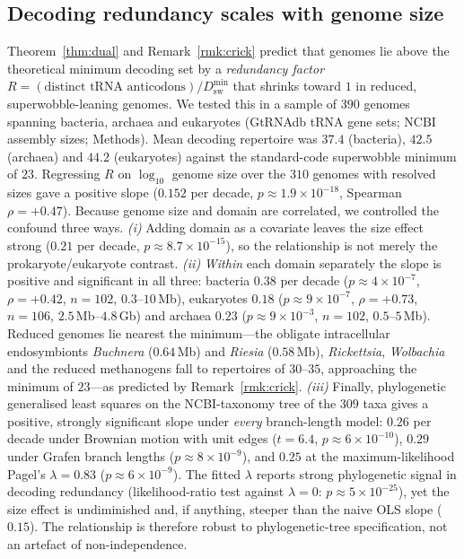 \documentclass[11pt]{article}
\theoremstyle{remark}
\newcommand{\Dsw}{D_{\mathrm{sw}}}
\begin{document}
\subsection{Decoding redundancy scales with genome size}

Theorem~\ref{thm:dual} and Remark~\ref{rmk:crick} predict that genomes lie above
the theoretical minimum decoding set by a \emph{redundancy factor}
$R=(\text{distinct tRNA anticodons})/\Dsw^{\min}$ that shrinks toward $1$ in
reduced, superwobble-leaning genomes. We tested this in a sample of $390$ genomes
spanning bacteria, archaea and eukaryotes (GtRNAdb tRNA gene sets; NCBI assembly
sizes; Methods). Mean decoding repertoire was $37.4$ (bacteria), $42.5$
(archaea) and $44.2$ (eukaryotes) against the standard-code superwobble minimum
of $23$. Regressing $R$ on $\log_{10}$ genome size over the $310$ genomes with
resolved sizes gave a positive slope ($0.152$ per decade,
$p\approx1.9\times10^{-18}$, Spearman $\rho=+0.47$). Because genome size and domain
are correlated, we controlled the confound three ways. \emph{(i)} Adding domain
as a covariate leaves the size effect strong ($0.21$ per decade,
$p\approx8.7\times10^{-15}$), so the relationship is not merely the
prokaryote/eukaryote contrast. \emph{(ii)} \emph{Within} each domain separately
the slope is positive and significant in all three: bacteria $0.38$ per decade
($p\approx4\times10^{-7}$, $\rho=+0.42$, $n=102$, $0.3$--$10$\,Mb), eukaryotes
$0.18$ ($p\approx9\times10^{-7}$, $\rho=+0.73$, $n=106$, $2.5$\,Mb--$4.8$\,Gb)
and archaea $0.23$ ($p\approx9\times10^{-3}$, $n=102$, $0.5$--$5$\,Mb). Reduced
genomes lie nearest the minimum---the obligate intracellular endosymbionts
\emph{Buchnera} ($0.64$\,Mb) and \emph{Riesia} ($0.58$\,Mb), \emph{Rickettsia},
\emph{Wolbachia} and the reduced methanogens fall to repertoires of $30$--$35$,
approaching the minimum of $23$---as predicted by Remark~\ref{rmk:crick}.
\emph{(iii)} Finally, phylogenetic generalised least squares on the
NCBI-taxonomy tree of the $309$ taxa gives a positive, strongly significant slope
under \emph{every} branch-length model: $0.26$ per decade under Brownian motion
with unit edges ($t=6.4$, $p\approx6\times10^{-10}$), $0.29$ under Grafen branch
lengths \cite{grafen89} ($p\approx8\times10^{-9}$), and $0.25$ at the
maximum-likelihood Pagel's $\lambda=0.83$ \cite{pagel99}
($p\approx6\times10^{-9}$). The fitted $\lambda$ reports strong phylogenetic
signal in decoding redundancy (likelihood-ratio test against $\lambda=0$:
$p\approx5\times10^{-25}$), yet the size effect is undiminished and, if anything,
steeper than the naive OLS slope ($0.15$). The relationship is therefore robust
to phylogenetic-tree specification, not an artefact of non-independence.
\end{document}
